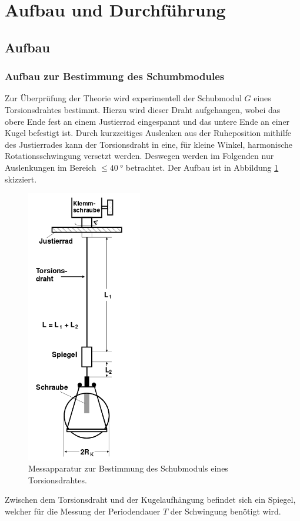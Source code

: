 \section{Aufbau und Durchführung}
\label{sec:Aufbau}
\subsection{Aufbau}
\subsubsection{Aufbau zur Bestimmung des Schumbmodules}
Zur Überprüfung der Theorie wird experimentell der Schubmodul $G$  eines Torsionsdrahtes bestimmt.
Hierzu wird dieser Draht aufgehangen, wobei das obere Ende fest an einem Justierrad eingespannt und das untere Ende an einer Kugel befestigt ist.
Durch kurzzeitiges Auslenken aus der Ruheposition mithilfe des Justierrades kann der Torsionsdraht in eine, für kleine Winkel, harmonische Rotationsschwingung versetzt werden.
Deswegen werden im Folgenden nur Auslenkungen im Bereich $\leq \SI{40}{\degree}$ betrachtet.
Der Aufbau ist in Abbildung \ref{fig:d1} skizziert.
\begin{figure}[H]
  \centering
  \includegraphics[height=12cm]{aufbau1.png}
  \caption{Messapparatur zur Bestimmung des Schubmoduls eines Torsionsdrahtes. \cite{sample}}
  \label{fig:d1}
\end{figure}
Zwischen dem Torsionsdraht und der Kugelaufhängung befindet sich ein Spiegel, welcher für die Messung der Periodendauer $T$ der Schwingung benötigt wird.
